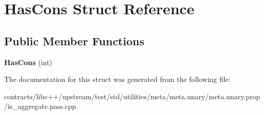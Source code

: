 \hypertarget{struct_has_cons}{}\section{Has\+Cons Struct Reference}
\label{struct_has_cons}
\subsection*{Public Member Functions}
\begin{DoxyCompactItemize}
\item 
\mbox{\label{struct_has_cons_a1c949a0f5a34b6032f6eb1f32c7ab2d8}} 
{\bfseries Has\+Cons} (int)
\end{DoxyCompactItemize}


The documentation for this struct was generated from the following file\+:\begin{DoxyCompactItemize}
\item 
contracts/libc++/upstream/test/std/utilities/meta/meta.\+unary/meta.\+unary.\+prop/is\+\_\+aggregate.\+pass.\+cpp\end{DoxyCompactItemize}
